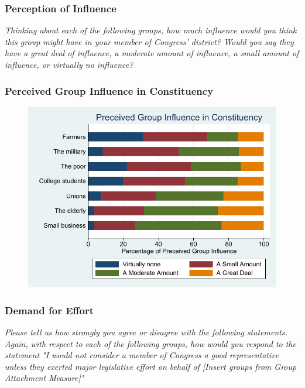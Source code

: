 \documentclass[14pt]{beamer}
\newcommand\e{\emph}
\begin{document}
\begin{frame}
\frametitle{Perception of Influence}
\begin{center}
	\e{Thinking about each of the following groups, how much influence would you think this group might have in your member of Congress' district? Would you say they have a great deal of influence, a moderate amount of influence, a small amount of influence, or virtually no influence?}
\end{center}
\end{frame}

\begin{frame}
\frametitle{Perceived Group Influence in Constituency}
\begin{figure}
	\centering
	{\includegraphics[width=.8\textwidth]{fig1color}}
\end{figure}
\end{frame}

\begin{frame}
\frametitle{Demand for Effort}
\small
\begin{center}
 \e{Please tell us how strongly you agree or disagree with the following statements. Again, with respect to each of the following groups, how would you respond to the statement "I would not consider a member of Congress a good representative unless they exerted major legislative effort on behalf of [Insert groups from Group Attachment Measure]"}
\end{center}
\end{frame}
\end{document}

